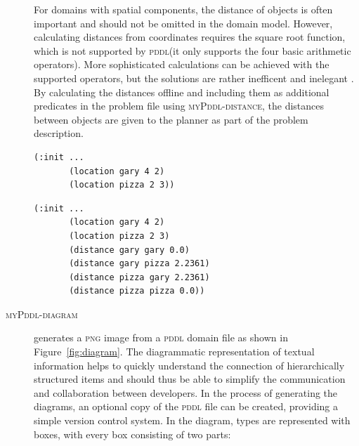 \documentclass[runningheads]{llncs}
\newcommand{\mypddl}{\textsc{myPddl}\xspace}
\newcommand{\mypddldiagram}{\textsc{myPddl-diagram}\xspace}
\newcommand{\mypddldistance}{\textsc{myPddl-distance}\xspace}
\newcommand{\pddl}{\textsc{pddl}\xspace}
\begin{document}
\begin{description}
For domains with spatial components, the distance of objects is often
important and should not be omitted in the domain model. However,
calculating distances from coordinates requires the square root
function, which is not supported by \pddl (it only supports the four
basic arithmetic operators). More sophisticated calculations can be
achieved with the supported operators, but the solutions are rather
inefficent and inelegant \cite{parkinson2012increasing}. By
calculating the distances offline and including them as additional
predicates in the problem file using \mypddldistance, the distances
between objects are given to the planner as part of the problem
description.

\begin{listing}[H]
\begin{verbatim}
(:init ...
       (location gary 4 2)
       (location pizza 2 3))
\end{verbatim}
\caption[Excerpt of the extended problem file before using
\mypddl-distance]{\label{ls:before-mypddl-distance}Excerpt of the
  \texttt{(:init~...)} block of the extended file \emph{Gary's Huge
    Problem} before using \mypddl-distance.}
\end{listing}

\begin{listing}[H]
\begin{verbatim}
(:init ...
       (location gary 4 2)
       (location pizza 2 3)
       (distance gary gary 0.0)
       (distance gary pizza 2.2361)
       (distance pizza gary 2.2361)
       (distance pizza pizza 0.0))
\end{verbatim}
\caption[Excerpt of the extended problem file after using
\mypddl-distance]{\label{ls:after-mypddl-distance}After the
  application of \mypddl-distance, the calculated distances are
  inserted in the \texttt{(:init ...)} code block in a copy of the
  problem file.}
\end{listing}


\item[\mypddldiagram] generates a \textsc{png} image from a \pddl
  domain file as shown in Figure~\ref{fig:diagram}. The diagrammatic
  representation of textual information helps to quickly understand
  the connection of hierarchically structured items and should thus be
  able to simplify the communication and collaboration between
  developers. In the process of generating the diagrams, an optional
  copy of the \pddl file can be created, providing a simple version
  control system. In the diagram, types are represented with
  boxes, with every box consisting of two parts:


\end{description}
\end{document}
